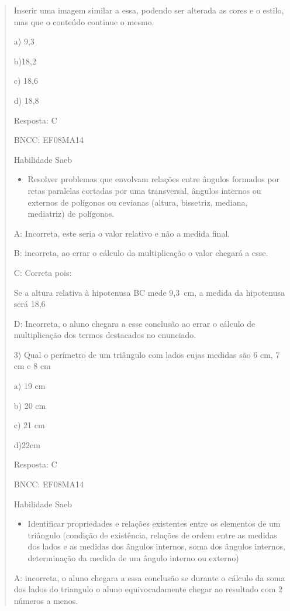 \begin{quote}
\begin{escolha}
Inserir uma imagem similar a essa, podendo ser alterada as cores e o
estilo, mas que o conteúdo continue o mesmo.

a) 9,3

b)18,2

c) 18,6

d) 18,8

Resposta: C

BNCC: EF08MA14

Habilidade Saeb

\begin{itemize}
\tightlist
\item
  Resolver problemas que envolvam relações entre ângulos formados por
  retas paralelas cortadas por uma transversal, ângulos internos ou
  externos de polígonos ou cevianas (altura, bissetriz, mediana,
  mediatriz) de polígonos.
\end{itemize}

A: Incorreta, este seria o valor relativo e não a medida final.

B: incorreta, ao errar o cálculo da multiplicação o valor chegará a
esse.

C: Correta pois:

Se a altura relativa à hipotenusa BC mede 9,3~cm, a medida da hipotenusa
será 18,6

D: Incorreta, o aluno chegara a esse conclusão ao errar o cálculo de
multiplicação dos termos destacados no enunciado.

3) Qual o perímetro de um triângulo com lados cujas medidas são 6 cm, 7
cm e 8 cm

a) 19 cm

b) 20 cm

c) 21 cm

d)22cm

Resposta: C

BNCC: EF08MA14

Habilidade Saeb

\begin{itemize}
\tightlist
\item
  Identificar propriedades e relações existentes entre os elementos de
  um triângulo (condição de existência, relações de ordem entre as
  medidas dos lados e as medidas dos ângulos internos, soma dos ângulos
  internos, determinação da medida de um ângulo interno ou externo)
\end{itemize}

A: incorreta, o aluno chegara a essa conclusão se durante o cálculo da
soma dos lados do triangulo o aluno equivocadamente chegar ao resultado
com 2 números a menos.


\end{escolha}
\end{quote}
